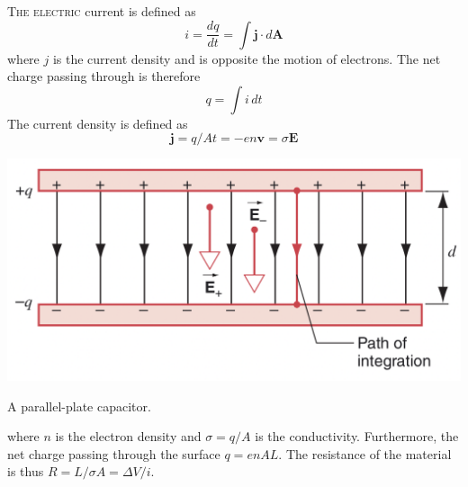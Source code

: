 \documentclass{tufte-book}
\renewcommand{\b}{\mathbf}
\begin{document}
\textsc{The electric} current is defined as
\begin{equation}
  i = \frac{dq}{dt} = \int \b j \cdot d \b A
\end{equation} where $j$ is the current density and is opposite the motion of electrons. The net charge passing through is therefore
\begin{equation}
  q = \int i \, dt
\end{equation}
The current density is defined as
\begin{equation}
  \b j = q/At = - en \b v = \sigma \b E
\end{equation}
\begin{marginfigure}
  \includegraphics[width=1\textwidth]{ppc}
  \caption{A parallel-plate capacitor.}
\end{marginfigure}
where $n$ is the electron density and $\sigma = q/A$ is the conductivity. Furthermore, the net charge passing through the surface $q = enAL$. The resistance of the material is thus $R = L/\sigma A = \Delta V / i$.
\end{document}
